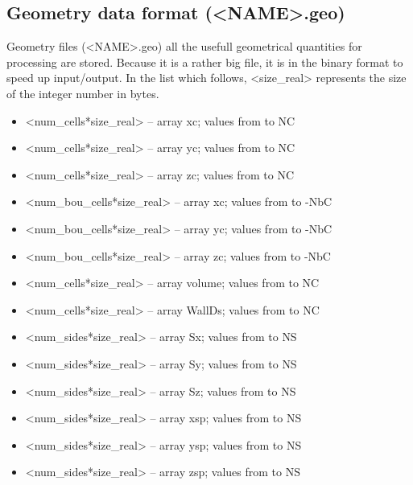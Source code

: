 \documentclass[10pt]{article}
\newcommand*{\tc}{\ttfamily} %
\begin{document}
    \subsection{Geometry data format ({\tc <NAME>.geo})}

    Geometry files ({\tc <NAME>.geo}) all the usefull geometrical
    quantities for processing are stored. 
    Because it is a rather big file, it is in
    the binary format to speed up input/output. In the list which
    follows, {\tc <size\_real>} represents the size of the
    integer number in bytes.                        
    \begin{itemize}
    \item {\tc <num\_cells*size\_real>} -- array {\tc xc}; values 
          from {\tc 1} to {\tc NC} 
    \item {\tc <num\_cells*size\_real>} -- array {\tc yc}; values 
          from {\tc 1} to {\tc NC} 
    \item {\tc <num\_cells*size\_real>} -- array {\tc zc}; values 
          from {\tc 1} to {\tc NC} 

    \item {\tc <num\_bou\_cells*size\_real>} -- array {\tc xc}; values 
          from {\tc -1} to {\tc -NbC} 
    \item {\tc <num\_bou\_cells*size\_real>} -- array {\tc yc}; values 
          from {\tc -1} to {\tc -NbC} 
    \item {\tc <num\_bou\_cells*size\_real>} -- array {\tc zc}; values 
          from {\tc -1} to {\tc -NbC} 

    \item {\tc <num\_cells*size\_real>} -- array {\tc volume}; values 
          from {\tc 1} to {\tc NC} 

    \item {\tc <num\_cells*size\_real>} -- array {\tc WallDs}; values 
          from {\tc 1} to {\tc NC} 

    \item {\tc <num\_sides*size\_real>} -- array {\tc Sx}; values 
          from {\tc 1} to {\tc NS} 
    \item {\tc <num\_sides*size\_real>} -- array {\tc Sy}; values 
          from {\tc 1} to {\tc NS} 
    \item {\tc <num\_sides*size\_real>} -- array {\tc Sz}; values 
          from {\tc 1} to {\tc NS} 

    \item {\tc <num\_sides*size\_real>} -- array {\tc xsp}; values 
          from {\tc 1} to {\tc NS} 
    \item {\tc <num\_sides*size\_real>} -- array {\tc ysp}; values 
          from {\tc 1} to {\tc NS} 
    \item {\tc <num\_sides*size\_real>} -- array {\tc zsp}; values 
          from {\tc 1} to {\tc NS} 


\end{itemize}
\end{document}
